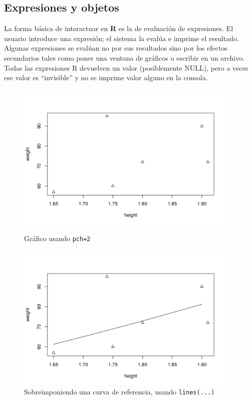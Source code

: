 \documentclass[spanish]{extbook}
\numberwithin{equation}{section}
\numberwithin{figure}{section}
\begin{document}
\subsection{Expresiones y objetos}

La forma básica de interactuar en \textbf{R} es la de evaluación de
expresiones. El usuario introduce una expresión; el sistema la evalúa e imprime
el resultado.  Algunas expresiones se evalúan no por sus resultados sino por
los efectos secundarios tales como poner una ventana de gráficos o escribir en
un archivo. Todas las expresiones R devuelven un valor (posiblemente NULL),
pero a veces ese valor es ``invisible''  y no se imprime valor alguno en la
consola.

\newpage
\begin{figure}[!htb]
	\centering
	\includegraphics[width=0.95\textwidth]{fig-3.png}
	\caption{Gráfico usando \texttt{pch=2}}
	\label{fig:fig-3}
	\centering
	\includegraphics[width=0.95\textwidth]{fig-4.png}
	\caption{Sobreimponiendo una curva de referencia, usando \texttt{lines(...)}}
	\label{fig:fig-4}
\end{figure}
\newpage
\end{document}
